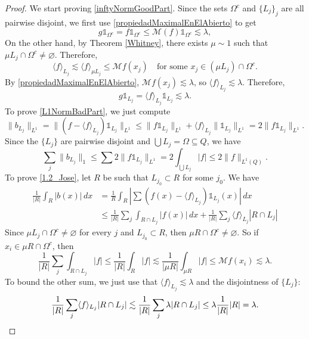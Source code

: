 \documentclass[10pt,a4paper]{amsart}
\newcommand{\one}{\mathds{1}}
\begin{document}
\begin{proof}
We start proving \eqref{inftyNormGoodPart}. Since the sets $\Omega^{c}$ and $\{L_j\}_j$ are all pairwise disjoint, we first use \eqref{propiedadMaximalEnElAbierto} to get
\[
g\one_{\Omega^c}
=
f\one_{\Omega^c}
\leq
\mathcal{M}(f)\one_{\Omega^c}
\lesssim
\lambda,
\]
On the other hand, by Theorem \ref{Whitney}, there exists $\mu\sim 1$ such that $\mu L_j\cap \Omega^{c}\neq\varnothing$. Therefore, 
    \[
    \langle f\rangle_{L_j}
    \lesssim 
    \langle f\rangle_{\mu L_j}
    \leq 
    \mathcal{M}f(x_j)\quad \text{for some }x_j\in (\mu L_j)\cap\Omega^{c}.
    \]
By \eqref{propiedadMaximalEnElAbierto}, $\mathcal{M}f(x_j)\lesssim \lambda$, so $\langle f\rangle_{L_j}\lesssim \lambda$. Therefore, 
\[
g\one_{L_j}
=
\langle f\rangle_{L_j}\one_{L_j}
\lesssim 
\lambda.
\]
To prove \eqref{L1NormBadPart}, we just compute
\[
\|b_{L_j}\|_{L^1}
=
\|(f-\langle f\rangle_{L_j})\one_{L_j}\|_{L^1}
\leq 
\|f\one_{L_j}\|_{L^1}
+
\langle f\rangle_{L_j}\|\one_{L_j}\|_{L^1}
=
2\|f\one_{L_j}\|_{L^1}.
\]
Since the $\{L_j\}$ are pairwise disjoint and $\bigcup L_j=\Omega\subseteq Q$, we have
\[
\sum_j \|b_{L_j}\|_{1}
\leq 
\sum 2\|f\one_{L_j}\|_{L^1}
=
2\int_{\bigcup L_j} |f|
\leq
2\|f\|_{L^1(Q)}.
\]
To prove \eqref{1.2_Jose}, let $R$ be such that $L_{j_0}\subset R$ for some $j_0$. We have
\begin{align*}
    \frac{1}{|R|}\int_{R}|b(x)|\, dx
    &=
    \frac{1}{R}\int_{R}\left|\sum (f(x)-\langle f\rangle_{L_j})\one_{L_j}(x)\right|\, dx
    \\&\leq 
    \frac{1}{|R|}\sum_{j}
    \int_{R\cap L_j}|f(x)|\, dx
    +
    \frac{1}{|R|}\sum_{j}\langle f\rangle_{L_j}|R\cap L_j|
\end{align*}
Since $\mu L_{j}\cap \Omega^{c}\neq\varnothing$ for every $j$ and $L_{j_0}\subset R$, then $\mu R\cap \Omega^{c}\neq \varnothing$. So if $x_i\in \mu R\cap\Omega^{c}$, then %
\[
\frac{1}{|R|}\sum_{j}\int_{R\cap L_j}|f|
\leq%
\frac{1}{|R|}\int_{R}|f|
\lesssim 
\frac{1}{|\mu R|}\int_{\mu R}|f|
\leq 
\mathcal{M}f(x_i)
\lesssim
\lambda.
\]
To bound the other sum, we just use that $\langle f\rangle_{L_j}\lesssim \lambda$ and the disjointness of $\{L_j\}$:
\[
\frac{1}{|R|}\sum_{j}\langle f\rangle_{L_{j}}|R\cap L_{j}|
\lesssim 
\frac{1}{|R|}\sum_{j}\lambda|R\cap L_{j}|
\leq  %
\lambda\frac{1}{|R|}|R|
=
\lambda.    \qedhere
\]
\end{proof}
\end{document}
